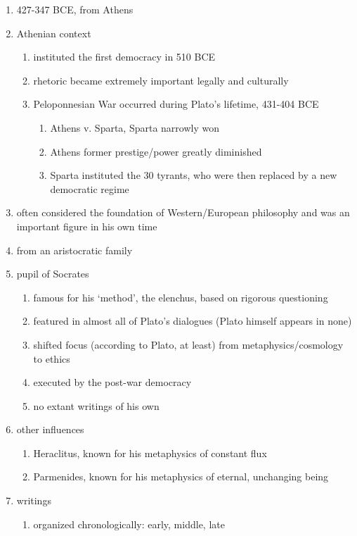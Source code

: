\documentclass[12pt]{article}
\begin{document}
\begin{enumerate}
\item 427-347 BCE, from Athens
\item Athenian context
    \begin{enumerate}
    \item instituted the first democracy in 510 BCE
    \item rhetoric became extremely important legally and culturally
    \item Peloponnesian War occurred during Plato's lifetime, 431-404 BCE
        \begin{enumerate}
        \item Athens v. Sparta, Sparta narrowly won
        \item Athens former prestige/power greatly diminished
        \item Sparta instituted the 30 tyrants, who were then replaced by a new democratic regime
    \end{enumerate}
    \end{enumerate}
\item often considered the foundation of Western/European philosophy and was an important figure in his own time
\item from an aristocratic family
\item pupil of Socrates
    \begin{enumerate}
    \item famous for his `method', the elenchus, based on rigorous questioning
    \item featured in almost all of Plato's dialogues (Plato himself appears in none)
    \item shifted focus (according to Plato, at least) from metaphysics/cosmology to ethics
    \item executed by the post-war democracy
    \item no extant writings of his own
    \end{enumerate}
\item other influences
    \begin{enumerate}
    \item Heraclitus, known for his metaphysics of constant flux
    \item Parmenides, known for his metaphysics of eternal, unchanging being
    \end{enumerate}
\item writings
    \begin{enumerate}
    \item organized chronologically: early, middle, late

\end{enumerate}
\end{enumerate}
\end{document}
